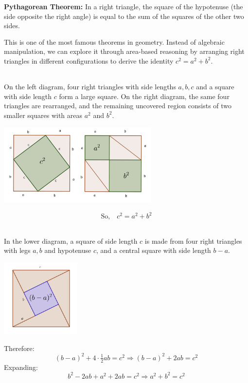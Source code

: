 \documentclass{article}
\begin{document}
\begin{example}\label{example:pythagorean-visual}
    \textbf{Pythagorean Theorem:} In a right triangle, the square of the hypotenuse (the side opposite the right angle) is equal to the sum of the squares of the other two sides.
      
\end{example}

\begin{analysis*}
    This is one of the most famous theorems in geometry. Instead of algebraic manipulation, we can explore it through area-based reasoning by arranging right triangles in different configurations to derive the identity \( c^2 = a^2 + b^2 \).
\end{analysis*}

\begin{soln}\ \\\indent
    On the left diagram, four right triangles with side lengths \( a, b, c \) and a square with side length \( c \) form a large square.  
    On the right diagram, the same four triangles are rearranged, and the remaining uncovered region consists of two smaller squares with areas \( a^2 \) and \( b^2 \).  
    \begin{center}
        \includegraphics[width=8cm]{./png/pythagorean-1.png}
    \end{center}

    \[
        \text{So,} \quad c^2 = a^2 + b^2
    \]
\end{soln}

\begin{soln}\ \\\indent
    In the lower diagram, a square of side length \( c \) is made from four right triangles with legs \( a, b \) and hypotenuse \( c \), and a central square with side length \( b - a \).  
    \begin{center}
        \includegraphics[width=4cm]{./png/pythagorean-2.png}
    \end{center}

    Therefore:
    \[
        (b - a)^2 + 4 \cdot \tfrac{1}{2} ab = c^2 \Rightarrow (b - a)^2 + 2ab = c^2
    \]
    Expanding:
    \[
        b^2 - 2ab + a^2 + 2ab = c^2 \Rightarrow a^2 + b^2 = c^2
    \]
\end{soln}
\end{document}
